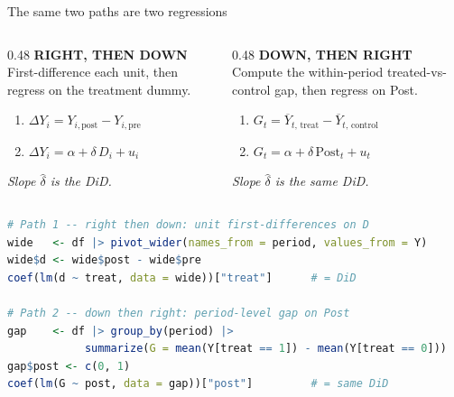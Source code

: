 \documentclass[aspectratio=169,11pt]{beamer}
\begin{document}
\begin{frame}[fragile]{The same two paths are two regressions}
\begin{columns}[T,onlytextwidth]
\begin{column}{0.48\textwidth}
{\color{accent}\bfseries\small RIGHT, THEN DOWN}\\[0.3em]
{\scriptsize First-difference each unit, then regress on the treatment dummy.}
\vspace{0.3em}
\begin{enumerate}\scriptsize
  \item $\Delta Y_i = Y_{i,\text{post}} - Y_{i,\text{pre}}$
  \item $\Delta Y_i = \alpha + \delta\,D_i + u_i$
\end{enumerate}
{\scriptsize\color{warmgray}\itshape Slope $\hat\delta$ is the DiD.}
\end{column}
\begin{column}{0.48\textwidth}
{\color{ocean}\bfseries\small DOWN, THEN RIGHT}\\[0.3em]
{\scriptsize Compute the within-period treated-vs-control gap, then regress on Post.}
\vspace{0.3em}
\begin{enumerate}\scriptsize
  \item $G_t = \overline{Y}_{t,\,\text{treat}} - \overline{Y}_{t,\,\text{control}}$
  \item $G_t = \alpha + \delta\,\text{Post}_t + u_t$
\end{enumerate}
{\scriptsize\color{warmgray}\itshape Slope $\hat\delta$ is the same DiD.}
\end{column}
\end{columns}

\vspace{0.4em}
\begin{lstlisting}[language=R,basicstyle=\ttfamily\scriptsize]
# Path 1 -- right then down: unit first-differences on D
wide   <- df |> pivot_wider(names_from = period, values_from = Y)
wide$d <- wide$post - wide$pre
coef(lm(d ~ treat, data = wide))["treat"]      # = DiD

# Path 2 -- down then right: period-level gap on Post
gap    <- df |> group_by(period) |>
            summarize(G = mean(Y[treat == 1]) - mean(Y[treat == 0]))
gap$post <- c(0, 1)
coef(lm(G ~ post, data = gap))["post"]         # = same DiD
\end{lstlisting}
\end{frame}
\end{document}
